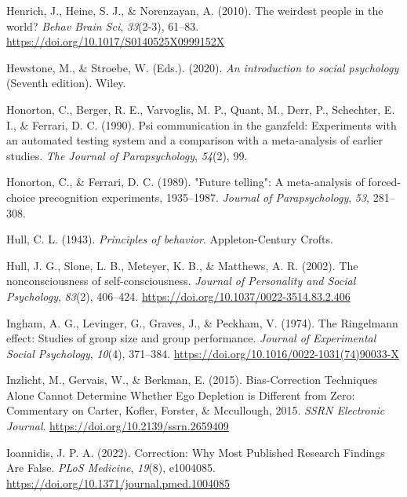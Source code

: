 \documentclass[
  letterpaper,
]{book}
\newlength{\cslhangindent}
\newenvironment{CSLReferences}[2] %
 {\begin{list}{}{%
  \setlength{\itemindent}{0pt}
  \setlength{\leftmargin}{0pt}
  \setlength{\parsep}{0pt}
  \ifodd #1
   \setlength{\leftmargin}{\cslhangindent}
   \setlength{\itemindent}{-1\cslhangindent}
  \fi
  \setlength{\itemsep}{#2\baselineskip}}}
 {\end{list}}
\begin{document}
\begin{CSLReferences}{1}{0}
Henrich, J., Heine, S. J., \& Norenzayan, A. (2010). The weirdest people
in the world? \emph{Behav Brain Sci}, \emph{33}(2-3), 61--83.
\url{https://doi.org/10.1017/S0140525X0999152X}

Hewstone, M., \& Stroebe, W. (Eds.). (2020). \emph{An introduction to
social psychology} (Seventh edition). Wiley.

Honorton, C., Berger, R. E., Varvoglis, M. P., Quant, M., Derr, P.,
Schechter, E. I., \& Ferrari, D. C. (1990). Psi communication in the
ganzfeld: Experiments with an automated testing system and a comparison
with a meta-analysis of earlier studies. \emph{The Journal of
Parapsychology}, \emph{54}(2), 99.

Honorton, C., \& Ferrari, D. C. (1989). "Future telling": A
meta-analysis of forced-choice precognition experiments, 1935--1987.
\emph{Journal of Parapsychology}, \emph{53}, 281--308.

Hull, C. L. (1943). \emph{Principles of behavior}. Appleton-Century
Crofts.

Hull, J. G., Slone, L. B., Meteyer, K. B., \& Matthews, A. R. (2002).
The nonconsciousness of self-consciousness. \emph{Journal of Personality
and Social Psychology}, \emph{83}(2), 406--424.
\url{https://doi.org/10.1037/0022-3514.83.2.406}

Ingham, A. G., Levinger, G., Graves, J., \& Peckham, V. (1974). The
{Ringelmann} effect: {Studies} of group size and group performance.
\emph{Journal of Experimental Social Psychology}, \emph{10}(4),
371--384. \url{https://doi.org/10.1016/0022-1031(74)90033-X}

Inzlicht, M., Gervais, W., \& Berkman, E. (2015). Bias-Correction
Techniques Alone Cannot Determine Whether Ego Depletion is Different
from Zero: Commentary on Carter, Kofler, Forster, \& Mccullough, 2015.
\emph{SSRN Electronic Journal}.
\url{https://doi.org/10.2139/ssrn.2659409}

Ioannidis, J. P. A. (2022). Correction: {Why} {Most} {Published}
{Research} {Findings} {Are} {False}. \emph{PLoS Medicine}, \emph{19}(8),
e1004085. \url{https://doi.org/10.1371/journal.pmed.1004085}


\end{CSLReferences}
\end{document}
